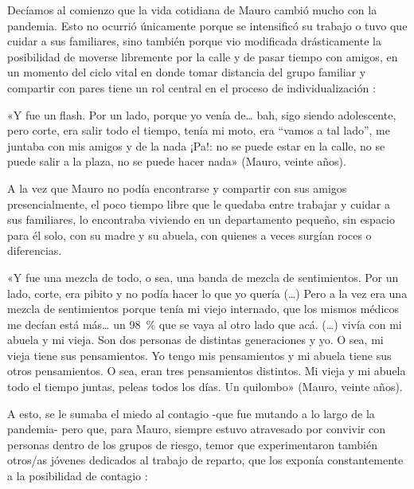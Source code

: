 \begin{refsection}
\begin{gbcita}
\end{gbcita}

Decíamos al comienzo que la vida cotidiana de Mauro cambió mucho con la pandemia. Esto no ocurrió únicamente porque se intensificó su trabajo o tuvo que cuidar a sus familiares, sino también porque vio modificada drásticamente la posibilidad de moverse libremente por la calle y de pasar tiempo con amigos, en un momento del ciclo vital en donde tomar distancia del grupo familiar y compartir con pares tiene un rol central en el proceso de individualización \protect\parencite{4242-MARTUCCELLI2012}:


\begin{gbcita}
«Y fue un flash. Por un lado, porque yo venía de… bah, sigo siendo adolescente, pero corte, era salir todo el tiempo, tenía mi moto, era “vamos a tal lado”, me juntaba con mis amigos y de la nada ¡Pa!: no se puede estar en la calle, no se puede salir a la plaza, no se puede hacer nada» (Mauro, veinte años).

\end{gbcita}

A la vez que Mauro no podía encontrarse y compartir con sus amigos presencialmente, el poco tiempo libre que le quedaba entre trabajar y cuidar a sus familiares, lo encontraba viviendo en un departamento pequeño, sin espacio para él solo, con su madre y su abuela, con quienes a veces surgían roces o diferencias.


\begin{gbcita}
«Y fue una mezcla de todo, o sea, una banda de mezcla de sentimientos. Por un lado, corte, era pibito y no podía hacer lo que yo quería (…) Pero a la vez era una mezcla de sentimientos porque tenía mi viejo internado, que los mismos médicos me decían está más… un \SI{98}{\percent} que se vaya al otro lado que acá. (…) vivía con mi abuela y mi vieja. Son dos personas de distintas generaciones y yo. O sea, mi vieja tiene sus pensamientos. Yo tengo mis pensamientos y mi abuela tiene sus otros pensamientos. O sea, eran tres pensamientos distintos. Mi vieja y mi abuela todo el tiempo juntas, peleas todos los días. Un quilombo» (Mauro, veinte años).

\end{gbcita}

A esto, se le sumaba el miedo al contagio -que fue mutando a lo largo de la pandemia- pero que, para Mauro, siempre estuvo atravesado por convivir con personas dentro de los grupos de riesgo, temor que experimentaron también otros/as jóvenes dedicados al trabajo de reparto, que los exponía constantemente a la posibilidad de contagio \protect\parencite{4235-PEREZMARTIRENA2022}:



\end{refsection}
